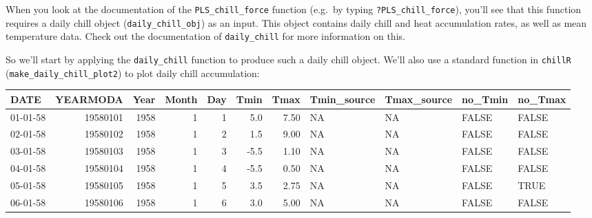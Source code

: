 \documentclass[
]{book}
\newenvironment{Shaded}{\begin{snugshade}}{\end{snugshade}}
\newcommand{\DataTypeTok}[1]{\textcolor[rgb]{0.13,0.29,0.53}{#1}}
\newcommand{\DecValTok}[1]{\textcolor[rgb]{0.00,0.00,0.81}{#1}}
\newcommand{\FloatTok}[1]{\textcolor[rgb]{0.00,0.00,0.81}{#1}}
\newcommand{\KeywordTok}[1]{\textcolor[rgb]{0.13,0.29,0.53}{\textbf{#1}}}
\newcommand{\NormalTok}[1]{#1}
\newcommand{\OperatorTok}[1]{\textcolor[rgb]{0.81,0.36,0.00}{\textbf{#1}}}
\newcommand{\StringTok}[1]{\textcolor[rgb]{0.31,0.60,0.02}{#1}}
\begin{document}
When you look at the documentation of the \texttt{PLS\_chill\_force} function (e.g.~by typing \texttt{?PLS\_chill\_force}), you'll see that this function requires a daily chill object (\texttt{daily\_chill\_obj}) as an input. This object contains daily chill and heat accumulation rates, as well as mean temperature data. Check out the documentation of \texttt{daily\_chill} for more information on this.

So we'll start by applying the \texttt{daily\_chill} function to produce such a daily chill object. We'll also use a standard function in \texttt{chillR} (\texttt{make\_daily\_chill\_plot2}) to plot daily chill accumulation:

\begin{Shaded}
\end{Shaded}

\begingroup\fontsize{8}{10}\selectfont

\begin{tabular}{l|r|r|r|r|r|r|l|l|l|l}
\hline
DATE & YEARMODA & Year & Month & Day & Tmin & Tmax & Tmin\_source & Tmax\_source & no\_Tmin & no\_Tmax\\
\hline
01-01-58 & 19580101 & 1958 & 1 & 1 & 5.0 & 7.50 & NA & NA & FALSE & FALSE\\
\hline
02-01-58 & 19580102 & 1958 & 1 & 2 & 1.5 & 9.00 & NA & NA & FALSE & FALSE\\
\hline
03-01-58 & 19580103 & 1958 & 1 & 3 & -5.5 & 1.10 & NA & NA & FALSE & FALSE\\
\hline
04-01-58 & 19580104 & 1958 & 1 & 4 & -5.5 & 0.50 & NA & NA & FALSE & FALSE\\
\hline
05-01-58 & 19580105 & 1958 & 1 & 5 & 3.5 & 2.75 & NA & NA & FALSE & TRUE\\
\hline
06-01-58 & 19580106 & 1958 & 1 & 6 & 3.0 & 5.00 & NA & NA & FALSE & FALSE\\
\hline
\end{tabular}
\endgroup{}
\end{document}
